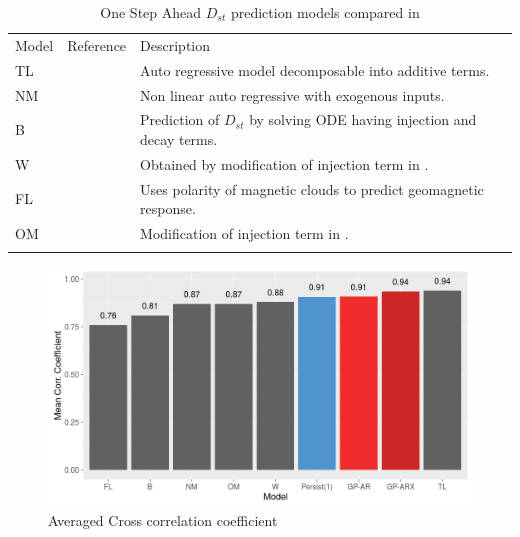 \documentclass[referee,a4paper,12pt,traditabstract]{swsc}
\begin{document}
\begin{linenumbers}
\begin{table}
      \caption[]{One Step Ahead $D_{st}$ prediction models compared in \citet{Ji2012}}
         \label{table:DstModels}
      
         \begin{tabular}{lll}
            \hline
            \noalign{\smallskip}
            Model  &  Reference  &  Description \\
            \noalign{\smallskip}
            \hline
            \noalign{\smallskip}
            TL & \citet{JGRA:JGRA16300} & Auto regressive model decomposable into additive terms.      \\
            NM & \citet{balikhin:narmax} & Non linear auto regressive with exogenous inputs. \\
            B & \citet{JGR:JGR10260} & Prediction of $D_{st}$ by solving ODE having injection and decay terms. \\
            W & \citet{Wang:Dst} & Obtained by modification of injection term in \citet{JGR:JGR10260}. \\
            FL & \citet{GRL:GRL11549} & Uses polarity of magnetic clouds to predict geomagnetic response.\\
            OM & \citet{JGRA:JGRA14856} & Modification of injection term in \citet{JGR:JGR10260}.\\
            \noalign{\smallskip}
            \hline
         \end{tabular}
\end{table}

\begin{figure}
   \centering
   \includegraphics[width=\textwidth]{Compare_CC.png}
      \caption{Averaged Cross correlation coefficient}
         \label{fig:cc}
   \end{figure}




\end{linenumbers}
\end{document}
